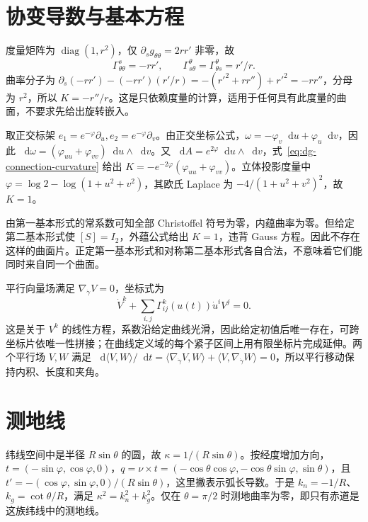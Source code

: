 \documentclass[UTF8,12pt,a4paper,fontset=fandol]{ctexbook}
\newcommand{\dd}{\mathop{}\!\mathrm d}
\newcommand{\ip}[2]{\langle #1,#2\rangle}
\begin{document}
\section{协变导数与基本方程}
\begin{solve}
度量矩阵为 $\operatorname{diag}(1,r^2)$，仅 $\partial_sg_{\theta\theta}=2rr'$ 非零，故
\[
 \Gamma^s_{\theta\theta}=-rr',\qquad
 \Gamma^\theta_{s\theta}=\Gamma^\theta_{\theta s}=r'/r.
\]
曲率分子为 $\partial_s(-rr')-(-rr')(r'/r)=-(r'^2+rr'')+r'^2=-rr''$，分母为 $r^2$，所以 $K=-r''/r$。这是只依赖度量的计算，适用于任何具有此度量的曲面，不要求先给出旋转嵌入。
\end{solve}

\begin{solve}
取正交标架 $e_1=e^{-\varphi}\partial_u,e_2=e^{-\varphi}\partial_v$。由正交坐标公式，$\omega=-\varphi_v\dd u+\varphi_u\dd v$，因此 $\dd\omega=(\varphi_{uu}+\varphi_{vv})\dd u\wedge\dd v$。又 $\dd A=e^{2\varphi}\dd u\wedge\dd v$，式~\eqref{eq:dg-connection-curvature} 给出 $K=-e^{-2\varphi}(\varphi_{uu}+\varphi_{vv})$。立体投影度量中 $\varphi=\log2-\log(1+u^2+v^2)$，其欧氏 Laplace 为 $-4/(1+u^2+v^2)^2$，故 $K=1$。
\end{solve}

\begin{solve}
由第一基本形式的常系数可知全部 Christoffel 符号为零，内蕴曲率为零。但给定第二基本形式使 $[S]=I_2$，外蕴公式给出 $K=1$，违背 Gauss 方程。因此不存在这样的曲面片。正定第一基本形式和对称第二基本形式各自合法，不意味着它们能同时来自同一个曲面。
\end{solve}

\begin{solve}
平行向量场满足 $\nabla_{\dot\gamma}V=0$，坐标式为
\[
 \dot V^k+\sum_{i,j}\Gamma^k_{ij}(u(t))\dot u^iV^j=0.
\]
这是关于 $V^k$ 的线性方程，系数沿给定曲线光滑，因此给定初值后唯一存在，可跨坐标片依唯一性拼接；在曲线定义域的每个紧子区间上用有限坐标片完成延伸。两个平行场 $V,W$ 满足 $\dd\ip VW/\dd t=\ip{\nabla_{\dot\gamma}V}W+\ip V{\nabla_{\dot\gamma}W}=0$，所以平行移动保持内积、长度和夹角。
\end{solve}

\section{测地线}
\begin{solve}
纬线空间中是半径 $R\sin\theta$ 的圆，故 $\kappa=1/(R\sin\theta)$。按经度增加方向，$t=(-\sin\varphi,\cos\varphi,0)$，$q=\nu\times t=(-\cos\theta\cos\varphi,-\cos\theta\sin\varphi,\sin\theta)$，且 $t'=-(\cos\varphi,\sin\varphi,0)/(R\sin\theta)$，这里撇表示弧长导数。于是 $k_n=-1/R$、$k_g=\cot\theta/R$，满足 $\kappa^2=k_n^2+k_g^2$。仅在 $\theta=\pi/2$ 时测地曲率为零，即只有赤道是这族纬线中的测地线。
\end{solve}
\end{document}
